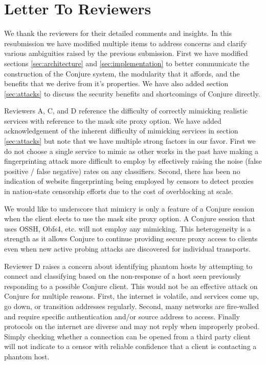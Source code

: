 \section{Letter To Reviewers}

We thank the reviewers for their detailed comments and insights. In this resubmission we have modified 
multiple items to address concerns and clarify various ambiguities raised by the previous submission. 
First we have modified sections \ref{sec:architecture} 
and \ref{sec:implementation} to better communicate the construction of the Conjure system, 
the modularity that it affords, and the benefits that we derive from it's properties. We 
have also added section \ref{sec:attacks} to discuss the security benefits and shortcomings 
of Conjure directly.

Reviewers A, C, and D reference the difficulty of correctly mimicking realistic services with
reference to the mask site proxy option. We have added acknowledgement of the inherent difficulty of mimicking 
services in section \ref{sec:attacks} but note that we have multiple strong factors in our
favor. First we do not choose a single service to mimic as other works in the past have 
\cite{stegotorus, skypemorph, censorspoofer} making a fingerprinting attack more difficult to employ by effectively raising the noise
(false positive / false negative) rates on any classifiers. Second, there has been no indication 
of website fingerprinting being employed by censors to detect proxies in nation-state censorship 
efforts due to the cost of overblocking at scale. 

We would like to underscore that mimicry is only a feature of a Conjure session when the client 
elects to use the mask site proxy option. A Conjure session that uses OSSH, Obfs4, etc. will 
not employ any mimicking. This heterogeneity is a strength as it allows Conjure to continue
providing secure proxy access to clients even when new active probing attacks are discovered for 
individual transports.

Reviewer D raises a concern about identifying phantom hosts by attempting to connect and
classifying based on the non-response of a host seen previously responding to a possible Conjure client. 
This would not be an effective attack on Conjure for multiple reasons. First, the internet is volatile,
and services come up, go down, or transition addresses regularly. Second, many networks are fire-walled
and require specific authentication and/or source address to access. Finally protocols on the internet
are diverse and may not reply when improperly probed. Simply checking whether a connection can be opened 
from a third party client will not indicate to a censor with reliable confidence that a client is 
contacting a phantom host. 

